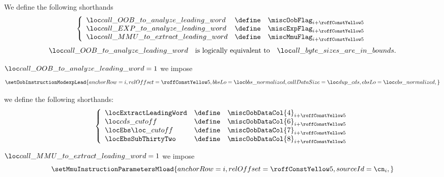 \begin{description}
\begin{description}
						\saNote{}
						We define the following shorthands
						\[
							\left\{ \begin{array}{lcl}
								\locCallOobForModexpForLeadWordExtractionAnalysis & \define & \miscOobFlag _{i + \prcModexpLeadRowOffset} \\
								\locCallExpForModexpToAnalyzeLeadingWord          & \define & \miscExpFlag _{i + \prcModexpLeadRowOffset} \\
								\locCallMmuForModexpToExtractLeadingWord          & \define & \miscMmuFlag _{i + \prcModexpLeadRowOffset} \\
							\end{array} \right.
							\]
							\saNote{}
							\[
								\locCallOobForModexpForLeadWordExtractionAnalysis{}
								\quad\text{is logically equivalent to}\quad
								\locAllByteSizesAreInBounds{}.
							\]
						\item[\underline{Setting \oobMod{} values:}]
						\If $\locCallOobForModexpForLeadWordExtractionAnalysis = 1$ \Then
						we impose
						\[
							\setOobInstructionModexpLead {
								anchorRow    = i                       ,
								relOffset    = \prcModexpLeadRowOffset ,
								bbsLo        = \locBbsNormalized       ,
								callDataSize = \locPrcCds              ,
								ebsLo        = \locEbsNormalized       ,
							}
						\]
					\item[\underline{Setting some shorthands:}]
						we define the following shorthands:
						\[
							\left\{ \begin{array}{lcl}
								\locExtractLeadingWord & \define & \miscOobDataCol{4} _{i + \prcModexpLeadRowOffset} \\
								\locCdsCutoff          & \define & \miscOobDataCol{6} _{i + \prcModexpLeadRowOffset} \\
								\locEbsCutoff          & \define & \miscOobDataCol{7} _{i + \prcModexpLeadRowOffset} \\
								\locEbsSubThirtyTwo    & \define & \miscOobDataCol{8} _{i + \prcModexpLeadRowOffset} \\
							\end{array} \right.
						\]
					\item[\underline{Setting \mmuMod{} values:}]
						\If $\locCallMmuForModexpToExtractLeadingWord = 1$ \Then we impose
						\[
							\setMmuInstructionParametersMload {
								anchorRow      = i                                   ,
								relOffset      = \prcModexpLeadRowOffset             ,
								sourceId       = \cn _{i}                            ,
}\]
\end{description}
\end{description}
